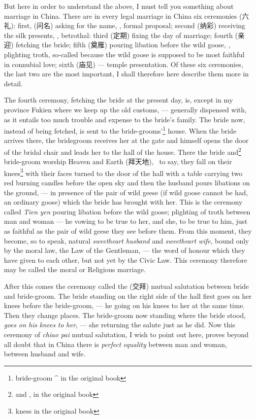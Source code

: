 But here in order to understand the above, I must tell you something about marriage in China.
There are in every legal marriage in China six ceremonies (六礼): first, (问名) asking for the name, \ie, formal proposal; second (纳彩) receiving the silk presents, \ie, betrothal: third (定期) fixing the day of marriage; fourth (亲迎) fetching the bride; fifth (奠雁) pouring libation before the wild  goose, \ie, plighting troth, so-called because the wild goose is supposed to be most faithful in connubial love; sixth (庙见) --- temple presentation.
Of these six ceremonies, the last two are the most important, I shall therefore here describe them more in detail.

The fourth ceremony, fetching the bride at the present day, is, except in my province Fukien where we keep up the old customs, --- generally dispensed with, as it entails too much trouble and expense to the bride's family.
The bride now, instead of being fetched, is sent to the bride-grooms'\footnote{bride-groom  $\^$ in the original book} house.
When the bride arrives there, the bridegroom receives her at the gate and himself opens the door of the bridal chair and leads her to the hall of the house.
There the bride and\footnote{and , in the original book} bride-groom worship Heaven and Earth (拜天地), \ie\, to say, they fall on their knees\footnote{kness in the original book} with their faces turned to the door of the hall with a table carrying two red burning candles before the open sky and then the husband pours libations on the ground, --- in presence of the pair of wild geese (if wild goose cannot be had, an ordinary goose) which the bride has brought with her.
This is the ceremony called \emph{Tien yen} pouring libation before the wild goose; plighting of troth between man and woman --- he vowing to be true to her, and she, to be true to him, just as faithful as the pair of wild geese they see before them.
From this moment, they become, so to speak, natural \emph{sweetheart husband} and \emph{sweetheart wife}, bound only by the moral law, the Law of the Gentleman, --- the word of honour which they have given to each other, but not yet by the Civic Law.
This ceremony therefore may be called the moral or Religious marriage.

After this comes the ceremony called the (交拜) mutual salutation between bride and bride-groom.
The bride standing on the right side of the hall first goes on her knees before the bride-groom, --- he going on his knees to her at the same time.
Then they change places.
The bride-groom now standing where the bride stood, \emph{goes on his knees to her}, --- she returning the salute just as he did.
Now this ceremony of \emph{chiao pai} mutual salutation, I wish to point out here, proves beyond all doubt that in China there is \emph{perfect equality} between man and woman, between husband and wife.

